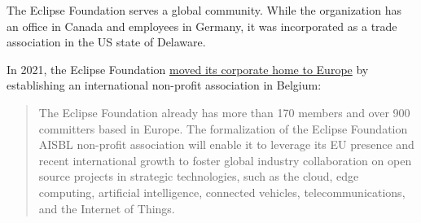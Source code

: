 \begin{kaobox}[frametitle=Eclipse Foundation's move to Europe]

The Eclipse Foundation serves a global community.  While the organization has an office in Canada and employees in Germany, it was incorporated as a trade association in the US state of Delaware.

In 2021, the Eclipse Foundation \href{https://newsroom.eclipse.org/news/announcements/open-source-software-leader-eclipse-foundation-officially-transitions-eu-based}{moved its corporate home to Europe} by establishing an international non-profit association in Belgium:

\begin{quote}

The Eclipse Foundation already has more than 170 members and over 900 committers based in Europe. The formalization of the Eclipse Foundation AISBL non-profit association will enable it to leverage its EU presence and recent international growth to foster global industry collaboration on open source projects in strategic technologies, such as the cloud, edge computing, artificial intelligence, connected vehicles, telecommunications, and the Internet of Things.

\end{quote}

\end{kaobox}

